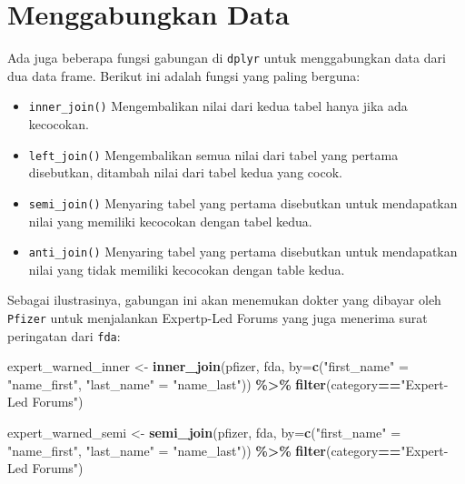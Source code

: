 \documentclass[
]{book}
\newenvironment{Shaded}{\begin{snugshade}}{\end{snugshade}}
\newcommand{\AttributeTok}[1]{\textcolor[rgb]{0.13,0.29,0.53}{#1}}
\newcommand{\FunctionTok}[1]{\textcolor[rgb]{0.13,0.29,0.53}{\textbf{#1}}}
\newcommand{\NormalTok}[1]{#1}
\newcommand{\OtherTok}[1]{\textcolor[rgb]{0.56,0.35,0.01}{#1}}
\newcommand{\SpecialCharTok}[1]{\textcolor[rgb]{0.81,0.36,0.00}{\textbf{#1}}}
\newcommand{\StringTok}[1]{\textcolor[rgb]{0.31,0.60,0.02}{#1}}
\providecommand{\tightlist}{%
  \setlength{\itemsep}{0pt}\setlength{\parskip}{0pt}}
\begin{document}
\hypertarget{menggabungkan-data}{%
\section{Menggabungkan Data}\label{menggabungkan-data}}

Ada juga beberapa fungsi gabungan di \texttt{dplyr} untuk menggabungkan data dari dua data frame. Berikut ini adalah fungsi yang paling berguna:

\begin{itemize}
\tightlist
\item
  \texttt{inner\_join()} Mengembalikan nilai dari kedua tabel hanya jika ada kecocokan.
\item
  \texttt{left\_join()} Mengembalikan semua nilai dari tabel yang pertama disebutkan, ditambah nilai dari tabel kedua yang cocok.
\item
  \texttt{semi\_join()} Menyaring tabel yang pertama disebutkan untuk mendapatkan nilai yang memiliki kecocokan dengan tabel kedua.
\item
  \texttt{anti\_join()} Menyaring tabel yang pertama disebutkan untuk mendapatkan nilai yang tidak memiliki kecocokan dengan table kedua.
\end{itemize}

Sebagai ilustrasinya, gabungan ini akan menemukan dokter yang dibayar oleh \texttt{Pfizer} untuk menjalankan Expertp-Led Forums yang juga menerima surat peringatan dari \texttt{fda}:

\begin{Shaded}
\begin{Highlighting}[]
\NormalTok{expert\_warned\_inner }\OtherTok{\textless{}{-}} \FunctionTok{inner\_join}\NormalTok{(pfizer, fda, }
                                  \AttributeTok{by=}\FunctionTok{c}\NormalTok{(}\StringTok{"first\_name"} \OtherTok{=} \StringTok{"name\_first"}\NormalTok{, }
                                       \StringTok{"last\_name"} \OtherTok{=} \StringTok{"name\_last"}\NormalTok{)) }\SpecialCharTok{\%\textgreater{}\%}
                                  \FunctionTok{filter}\NormalTok{(category}\SpecialCharTok{==}\StringTok{"Expert{-}Led Forums"}\NormalTok{)}

\NormalTok{expert\_warned\_semi }\OtherTok{\textless{}{-}} \FunctionTok{semi\_join}\NormalTok{(pfizer, fda, }
                                \AttributeTok{by=}\FunctionTok{c}\NormalTok{(}\StringTok{"first\_name"} \OtherTok{=} \StringTok{"name\_first"}\NormalTok{, }
                                     \StringTok{"last\_name"} \OtherTok{=} \StringTok{"name\_last"}\NormalTok{)) }\SpecialCharTok{\%\textgreater{}\%}
                                \FunctionTok{filter}\NormalTok{(category}\SpecialCharTok{==}\StringTok{"Expert{-}Led Forums"}\NormalTok{)}
\end{Highlighting}
\end{Shaded}
\end{document}
